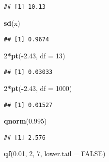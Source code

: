 \documentclass[10pt,]{krantz}
\makeatletter
\newenvironment{Shaded}{\begin{snugshade}}{\end{snugshade}}
\newcommand{\KeywordTok}[1]{\textcolor[rgb]{0.13,0.29,0.53}{\textbf{#1}}}
\newcommand{\DataTypeTok}[1]{\textcolor[rgb]{0.13,0.29,0.53}{#1}}
\newcommand{\DecValTok}[1]{\textcolor[rgb]{0.00,0.00,0.81}{#1}}
\newcommand{\FloatTok}[1]{\textcolor[rgb]{0.00,0.00,0.81}{#1}}
\newcommand{\OtherTok}[1]{\textcolor[rgb]{0.56,0.35,0.01}{#1}}
\newcommand{\OperatorTok}[1]{\textcolor[rgb]{0.81,0.36,0.00}{\textbf{#1}}}
\newcommand{\NormalTok}[1]{#1}
\newenvironment{kframe}{%
\medskip{}
\setlength{\fboxsep}{.8em}
 \def\at@end@of@kframe{}%
 \ifinner\ifhmode%
  \def\at@end@of@kframe{\end{minipage}}%
  \begin{minipage}{\columnwidth}%
 \fi\fi%
 \def\FrameCommand##1{\hskip\@totalleftmargin \hskip-\fboxsep
 \colorbox{shadecolor}{##1}\hskip-\fboxsep
     \hskip-\linewidth \hskip-\@totalleftmargin \hskip\columnwidth}%
 \MakeFramed {\advance\hsize-\width
   \@totalleftmargin\z@ \linewidth\hsize
   \@setminipage}}%
 {\par\unskip\endMakeFramed%
 \at@end@of@kframe}
\renewenvironment{Shaded}{\begin{kframe}}{\end{kframe}}
\makeatother
\begin{document}
\begin{verbatim}
## [1] 10.13
\end{verbatim}

\begin{Shaded}
\begin{Highlighting}[]
\KeywordTok{sd}\NormalTok{(x)}
\end{Highlighting}
\end{Shaded}

\begin{verbatim}
## [1] 0.9674
\end{verbatim}

\begin{Shaded}
\begin{Highlighting}[]
\DecValTok{2}\OperatorTok{*}\KeywordTok{pt}\NormalTok{(}\OperatorTok{-}\FloatTok{2.43}\NormalTok{, }\DataTypeTok{df =} \DecValTok{13}\NormalTok{)}
\end{Highlighting}
\end{Shaded}

\begin{verbatim}
## [1] 0.03033
\end{verbatim}

\begin{Shaded}
\begin{Highlighting}[]
\DecValTok{2}\OperatorTok{*}\KeywordTok{pt}\NormalTok{(}\OperatorTok{-}\FloatTok{2.43}\NormalTok{, }\DataTypeTok{df =} \DecValTok{1000}\NormalTok{)}
\end{Highlighting}
\end{Shaded}

\begin{verbatim}
## [1] 0.01527
\end{verbatim}

\begin{Shaded}
\begin{Highlighting}[]
\KeywordTok{qnorm}\NormalTok{(}\FloatTok{0.995}\NormalTok{)}
\end{Highlighting}
\end{Shaded}

\begin{verbatim}
## [1] 2.576
\end{verbatim}

\begin{Shaded}
\begin{Highlighting}[]
\KeywordTok{qf}\NormalTok{(}\FloatTok{0.01}\NormalTok{, }\DecValTok{2}\NormalTok{, }\DecValTok{7}\NormalTok{, }\DataTypeTok{lower.tail =} \OtherTok{FALSE}\NormalTok{)}
\end{Highlighting}
\end{Shaded}
\end{document}
